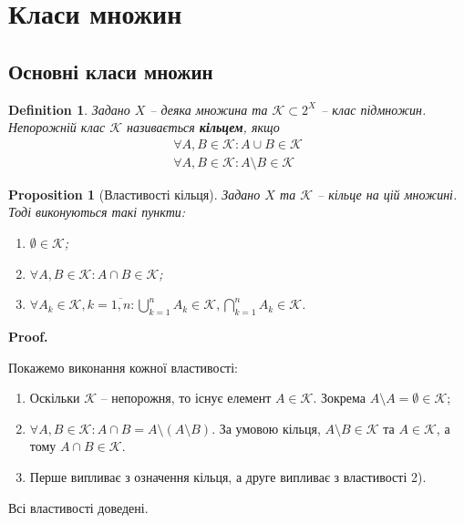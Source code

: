 \documentclass[a4paper, 10pt]{article}
\makeatletter
\theoremstyle{theoremdd}
\newtheorem{definition}[theorem]{Definition}
\newtheorem{proposition}[theorem]{Proposition}
\renewenvironment{proof}[1][Proof.\\]{\par
\pushQED{\hfill \qed}%
\normalfont \topsep6\p@\@plus6\p@\relax
\trivlist
\item\relax
{\bfseries
#1\@addpunct{.}}\hspace\labelsep\ignorespaces
}{%
\popQED\endtrivlist\@endpefalse
}
\makeatother
\begin{document}
\thispagestyle{empty}

\thispagestyle{empty}
\tableofcontents
\newpage

\section{Класи множин}
\subsection{Основні класи множин}
\begin{definition}
Задано $X$ -- деяка множина та $\mathcal{K} \subset 2^X$ -- клас підмножин.\\
Непорожній клас $\mathcal{K}$ називається \textbf{кільцем}, якщо
\begin{align*}
\forall A,B \in \mathcal{K}: A \cup B \in \mathcal{K} \\
\forall A,B \in \mathcal{K}: A \setminus B \in \mathcal{K}
\end{align*}
\end{definition}

\begin{proposition}[Властивості кільця]
Задано $X$ та $\mathcal{K}$ -- кільце на цій множині. Тоді виконуються такі пункти:
\begin{enumerate}[nosep,wide=0pt,label={\arabic*)}]
\item $\emptyset \in \mathcal{K}$;
\item $\forall A,B \in \mathcal{K}: A \cap B \in \mathcal{K}$;
\item $\forall A_k \in \mathcal{K}, k = \overline{1,n}: \displaystyle\bigcup_{k=1}^n A_k \in \mathcal{K}, \displaystyle\bigcap_{k=1}^n A_k \in \mathcal{K}$.
\end{enumerate}
\end{proposition}

\begin{proof}
Покажемо виконання кожної властивості:
\begin{enumerate}[wide=0pt,label={\arabic*)}]
\item Оскільки $\mathcal{K}$ -- непорожня, то існує елемент $A \in \mathcal{K}$. Зокрема $A \setminus A = \emptyset \in \mathcal{K}$;
\item $\forall A,B \in \mathcal{K}: A \cap B = A \setminus (A \setminus B)$. За умовою кільця, $A \setminus B \in \mathcal{K}$ та $A \in \mathcal{K}$, а тому $A \cap B \in \mathcal{K}$.
\item Перше випливає з означення кільця, а друге випливає з властивості 2).
\end{enumerate}
Всі властивості доведені.
\end{proof}
\end{document}
